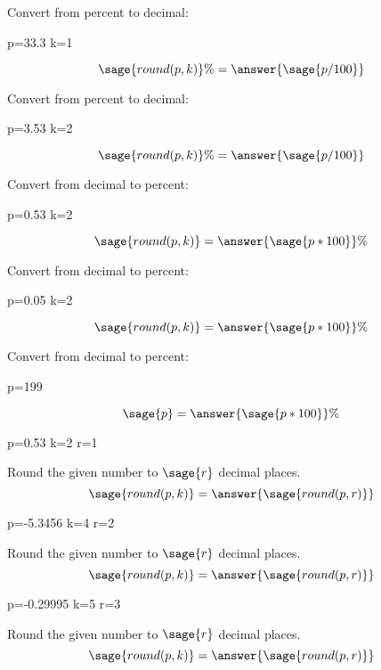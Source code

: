 \documentclass{ximera}
\begin{document}
\begin{problem} Convert from percent to decimal:
\begin{sagesilent}
p=33.3
k=1
\end{sagesilent}
$$\sage{round(p,k)}\%=\answer{\sage{p/100}}$$
\end{problem}


\begin{problem} Convert from percent to decimal:
\begin{sagesilent}
p=3.53
k=2
\end{sagesilent}
$$\sage{round(p,k)}\%=\answer{\sage{p/100}}$$
\end{problem}


\begin{problem} Convert from decimal to percent:
\begin{sagesilent}
p=0.53
k=2
\end{sagesilent}
$$\sage{round(p,k)}=\answer{\sage{p*100}}\%$$
\end{problem}


\begin{problem} Convert from decimal to percent:
\begin{sagesilent}
p=0.05
k=2
\end{sagesilent}
$$\sage{round(p,k)}=\answer{\sage{p*100}}\%$$
\end{problem}


\begin{problem} Convert from decimal to percent:
\begin{sagesilent}
p=199
\end{sagesilent}
$$\sage{p}=\answer{\sage{p*100}}\%$$
\end{problem}

\begin{problem}
\begin{sagesilent}
p=0.53
k=2
r=1
\end{sagesilent}
Round the given number to $\sage{r}$ decimal places.
$$\sage{round(p,k)}=\answer{\sage{round(p,r)}}$$
\end{problem}

\begin{problem}
\begin{sagesilent}
p=-5.3456
k=4
r=2
\end{sagesilent}
Round the given number to $\sage{r}$ decimal places.
$$\sage{round(p,k)}=\answer{\sage{round(p,r)}}$$
\end{problem}


\begin{problem}
\begin{sagesilent}
p=-0.29995
k=5
r=3
\end{sagesilent}
Round the given number to $\sage{r}$ decimal places.
$$\sage{round(p,k)}=\answer{\sage{round(p,r)}}$$
\end{problem}
\end{document}
